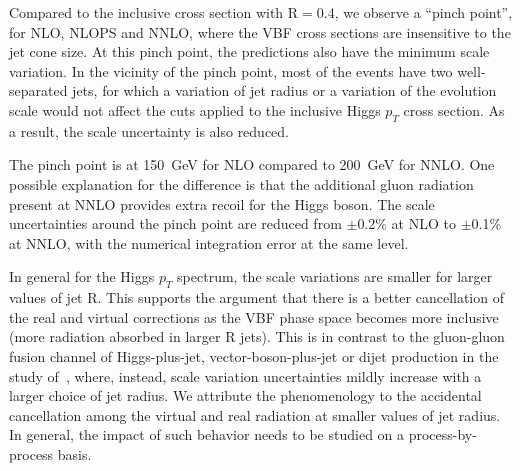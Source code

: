 \documentclass[10pt,prd,fleqn,superscriptaddress,notitlepage,nofootinbib,preprintnumbers,nobalancelastpage]{revtex4-1}
\newcommand{\VBF}{VBF\xspace}
\begin{document}
Compared to the inclusive cross section with R$=0.4$, we observe a ``pinch point'', for NLO, NLOPS and NNLO, where the \VBF cross sections are insensitive to the  jet cone size. At this pinch point,  the predictions also have the minimum scale variation. In the vicinity of the pinch point, most of the events have two well-separated jets, for which a  variation of jet radius or a variation of the evolution scale would not affect the cuts applied to the inclusive Higgs $p_T$ cross section.
As a result,
the scale uncertainty is also reduced.

The pinch point is at 150~GeV for NLO compared to 200~GeV for NNLO. One possible explanation for the difference is that the additional gluon radiation present at NNLO provides extra recoil for the Higgs boson.
The scale uncertainties around the pinch point are reduced from $\pm$0.2\% at NLO to $\pm$0.1\% at NNLO, with the numerical integration error at the same level.

In general for the Higgs $p_T$ spectrum, the scale variations are smaller for larger values of  jet R.  This supports the argument that there is a better cancellation of the real and virtual corrections as the \VBF phase space becomes more inclusive (more radiation absorbed in larger R jets).
This is in contrast to the gluon-gluon fusion channel of Higgs-plus-jet, vector-boson-plus-jet or dijet production in the study of~\cite{Bellm:2019yyh}, where, instead, scale variation uncertainties mildly increase with a larger choice of jet radius. We attribute the phenomenology to the accidental cancellation among the virtual and real radiation at smaller values of jet radius. In general, the impact of such behavior needs to be studied on a process-by-process basis.
\end{document}
